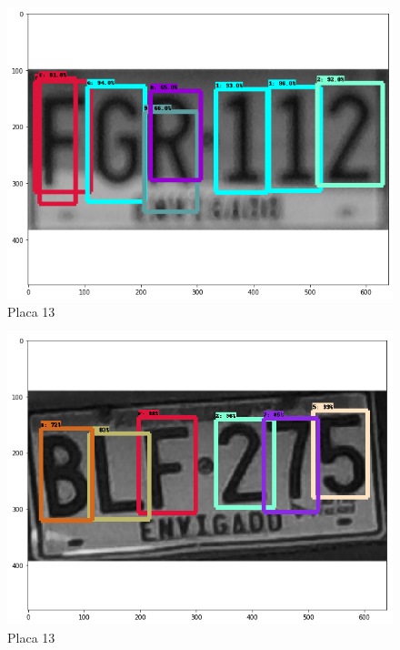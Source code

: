 \begin{figure}[H]
\centering
\includegraphics[width=0.4\linewidth]{imagenes/caracteres detectados/nuevo entrenamiento/30.png}
\caption{Placa 13}
\label{fig:caracteres detectados p15}
\end{figure}

\begin{table}[H]
    \centering
    \caption{Detección de caracteres con porcentajes de acierto placa 13}
    \label{tab:p15}
\end{table}


\begin{figure}[H]
\centering
\includegraphics[width=0.4\linewidth]{imagenes/MODELO_5/resul_2_mod5.png}
\caption{Placa 13}
\label{fig:caracteres detectados p16}
\end{figure}

